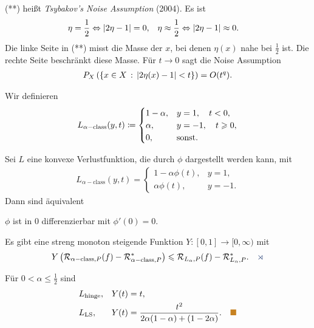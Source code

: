 (**) heißt \emph{Tsybakov's Noise Assumption}  (2004). Es ist
\begin{align*}
&\eta = \frac{1}{2} \Leftrightarrow
\left|2\eta-1\right| = 0,
&&\eta \approx \frac{1}{2} \Leftrightarrow
\left|2\eta-1\right| \approx 0.
\end{align*}  
Die linke Seite in (**) misst die Masse der $x$, bei denen $\eta(x)$ nahe bei
$\frac{1}{2}$ ist. Die rechte Seite beschränkt diese Masse. Für $t\to 0$ sagt
die Noise Assumption
\begin{align*}
P_X\left(\left\{ x\in X\,:\,\left|2\eta(x)-1\right| < t\right\}\right)
 = O(t^q).
\end{align*}

\newcommand{\aclass}{{\alpha-\mathrm{class}}}
Wir definieren
\begin{align*}
L_{\aclass}(y,t) \defl
\begin{cases}
1-\alpha, & y = 1,\quad t < 0,\\
\alpha, & y= -1, \quad t\ge 0,\\
0 , & \text{sonst}.
\end{cases}
\end{align*}

\begin{prop}
\label{prop:7.2}
Sei $L$ eine konvexe Verlustfunktion, die durch $\phi$ dargestellt werden kann,
mit
\begin{align*}
L_\aclass(y,t) =
\begin{cases}
1-\alpha\phi(t), & y=1,\\
\alpha\phi(t), & y=-1.
\end{cases}
\end{align*}
Dann sind äquivalent
\begin{equivenum}
\item $\phi$ ist in $0$ differenzierbar mit $\phi'(0) = 0$.
\item Es gibt eine streng monoton steigende Funktion $Y: [0,1]\to [0,\infty)$
mit
\begin{align*}
Y\left(\RR_{\aclass,P}(f)-\RR_{\aclass,P}^* \right)
\le \RR_{L_\alpha,P}(f)-\RR_{L_\alpha,P}^*.\fishhere
\end{align*}
\end{equivenum}
\end{prop}

\begin{bsp*}
Für $0<\alpha\le \frac{1}{2}$ sind
\begin{align*}
&L_\mathrm{hinge}, && Y(t) = t,\\
&L_\mathrm{LS}, && Y(t) = \frac{t^2}{2\alpha(1-\alpha)+(1-2\alpha)}.\bsphere
\end{align*}
\end{bsp*}

